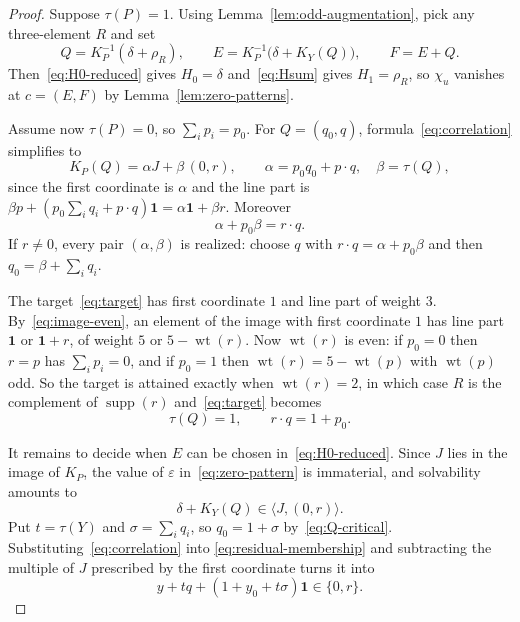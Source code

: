 \documentclass[11pt]{article}
\theoremstyle{definition}
\theoremstyle{remark}
\newcommand{\supp}{\operatorname{supp}}
\newcommand{\wt}{\operatorname{wt}}
\newcommand{\one}{\mathbf 1}
\begin{document}
\begin{proof}
Suppose $\tau(P)=1$.  Using Lemma~\ref{lem:odd-augmentation}, pick any
three-element $R$ and set
\[
 Q=K_P^{-1}(\delta+\rho_R),
 \qquad
 E=K_P^{-1}\bigl(\delta+K_Y(Q)\bigr),
 \qquad F=E+Q .
\]
Then~\eqref{eq:H0-reduced} gives $H_0=\delta$ and~\eqref{eq:Hsum} gives
$H_1=\rho_R$, so $\chi_u$ vanishes at $c=(E,F)$ by
Lemma~\ref{lem:zero-patterns}.

Assume now $\tau(P)=0$, so $\sum_ip_i=p_0$.  For $Q=(q_0,q)$,
formula~\eqref{eq:correlation} simplifies to
\begin{equation}\label{eq:image-even}
 K_P(Q)=\alpha J+\beta\,(0,r),
 \qquad
 \alpha=p_0q_0+p\cdot q,\quad \beta=\tau(Q),
\end{equation}
since the first coordinate is $\alpha$ and the line part is
$\beta p+(p_0\sum_iq_i+p\cdot q)\one=\alpha\one+\beta r$.  Moreover
\begin{equation}\label{eq:alpha-beta}
 \alpha+p_0\beta=r\cdot q .
\end{equation}
If $r\neq0$, every pair $(\alpha,\beta)$ is realized: choose $q$ with
$r\cdot q=\alpha+p_0\beta$ and then $q_0=\beta+\sum_iq_i$.

The target~\eqref{eq:target} has first coordinate $1$ and line part of
weight $3$.  By~\eqref{eq:image-even}, an element of the image with
first coordinate $1$ has line part $\one$ or $\one+r$, of weight $5$ or
$5-\wt(r)$.  Now $\wt(r)$ is even: if $p_0=0$ then $r=p$ has
$\sum_ip_i=0$, and if $p_0=1$ then $\wt(r)=5-\wt(p)$ with $\wt(p)$
odd.  So the target is attained exactly when $\wt(r)=2$, in which case
$R$ is the complement of $\supp(r)$ and~\eqref{eq:target} becomes
\begin{equation}\label{eq:Q-critical}
 \tau(Q)=1,\qquad r\cdot q=1+p_0 .
\end{equation}

It remains to decide when $E$ can be chosen in~\eqref{eq:H0-reduced}.
Since $J$ lies in the image of $K_P$, the value of $\varepsilon$
in~\eqref{eq:zero-pattern} is immaterial, and solvability amounts to
\begin{equation}\label{eq:residual-membership}
 \delta+K_Y(Q)\in\langle J,(0,r)\rangle .
\end{equation}
Put $t=\tau(Y)$ and $\sigma=\sum_iq_i$, so $q_0=1+\sigma$
by~\eqref{eq:Q-critical}.  Substituting~\eqref{eq:correlation} into
\eqref{eq:residual-membership} and subtracting the multiple of $J$
prescribed by the first coordinate turns it into
\begin{equation}\label{eq:critical-affine}
 y+tq+(1+y_0+t\sigma)\one\in\{0,r\} .
\end{equation}


\end{proof}
\end{document}
